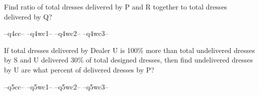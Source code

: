 \question   Find ratio of total dresses delivered by P and R together to total dresses delivered by Q?

\begin{randomizechoices}
\correctchoice --q4cc-- 
\choice --q4wc1--  
\choice --q4wc2-- 
\choice --q4wc3-- 
\end{randomizechoices}

\question   If total dresses delivered by Dealer U is 100\% more than total undelivered dresses by S and U delivered 30\% of total designed dresses, then find undelivered dresses by U are what percent of delivered dresses by P?

\begin{randomizechoices}
\correctchoice --q5cc-- 
\choice --q5wc1--  
\choice --q5wc2-- 
\choice --q5wc3-- 
\end{randomizechoices}